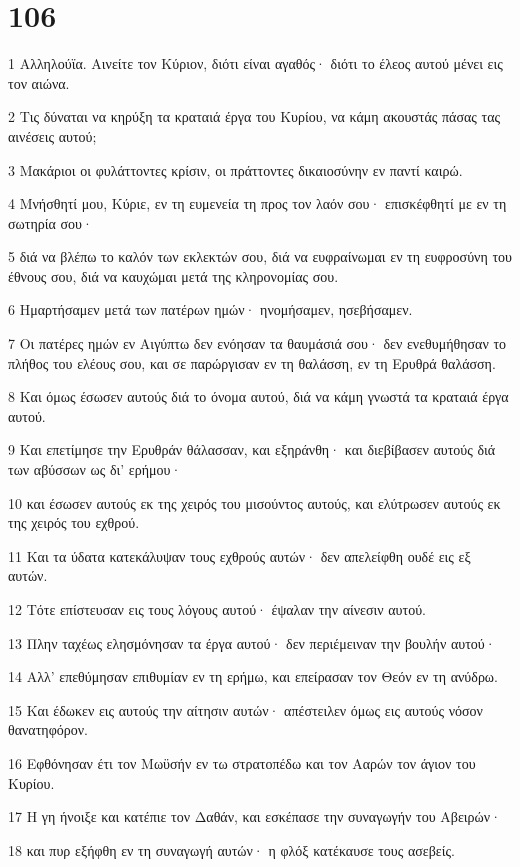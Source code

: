 \chapter{106}

\par 1 Αλληλούϊα. Αινείτε τον Κύριον, διότι είναι αγαθός· διότι το έλεος αυτού μένει εις τον αιώνα.
\par 2 Τις δύναται να κηρύξη τα κραταιά έργα του Κυρίου, να κάμη ακουστάς πάσας τας αινέσεις αυτού;
\par 3 Μακάριοι οι φυλάττοντες κρίσιν, οι πράττοντες δικαιοσύνην εν παντί καιρώ.
\par 4 Μνήσθητί μου, Κύριε, εν τη ευμενεία τη προς τον λαόν σου· επισκέφθητί με εν τη σωτηρία σου·
\par 5 διά να βλέπω το καλόν των εκλεκτών σου, διά να ευφραίνωμαι εν τη ευφροσύνη του έθνους σου, διά να καυχώμαι μετά της κληρονομίας σου.
\par 6 Ημαρτήσαμεν μετά των πατέρων ημών· ηνομήσαμεν, ησεβήσαμεν.
\par 7 Οι πατέρες ημών εν Αιγύπτω δεν ενόησαν τα θαυμάσιά σου· δεν ενεθυμήθησαν το πλήθος του ελέους σου, και σε παρώργισαν εν τη θαλάσση, εν τη Ερυθρά θαλάσση.
\par 8 Και όμως έσωσεν αυτούς διά το όνομα αυτού, διά να κάμη γνωστά τα κραταιά έργα αυτού.
\par 9 Και επετίμησε την Ερυθράν θάλασσαν, και εξηράνθη· και διεβίβασεν αυτούς διά των αβύσσων ως δι' ερήμου·
\par 10 και έσωσεν αυτούς εκ της χειρός του μισούντος αυτούς, και ελύτρωσεν αυτούς εκ της χειρός του εχθρού.
\par 11 Και τα ύδατα κατεκάλυψαν τους εχθρούς αυτών· δεν απελείφθη ουδέ εις εξ αυτών.
\par 12 Τότε επίστευσαν εις τους λόγους αυτού· έψαλαν την αίνεσιν αυτού.
\par 13 Πλην ταχέως ελησμόνησαν τα έργα αυτού· δεν περιέμειναν την βουλήν αυτού·
\par 14 Αλλ' επεθύμησαν επιθυμίαν εν τη ερήμω, και επείρασαν τον Θεόν εν τη ανύδρω.
\par 15 Και έδωκεν εις αυτούς την αίτησιν αυτών· απέστειλεν όμως εις αυτούς νόσον θανατηφόρον.
\par 16 Εφθόνησαν έτι τον Μωϋσήν εν τω στρατοπέδω και τον Ααρών τον άγιον του Κυρίου.
\par 17 Η γη ήνοιξε και κατέπιε τον Δαθάν, και εσκέπασε την συναγωγήν του Αβειρών·
\par 18 και πυρ εξήφθη εν τη συναγωγή αυτών· η φλόξ κατέκαυσε τους ασεβείς.
